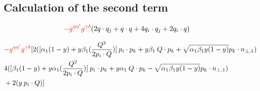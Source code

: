 
\subsection*{Calculation of the second term}

\begin{equation}
\begin{split}
&{\color[RGB]{255,0,0} -g^{{{\eta}}{{\eta}^{\prime}}}g^{{{\gamma}}{{\delta}}}}( 2q\cdot q_j+ q\cdot q+4q_i \cdot q_j+2q_i \cdot q)
\end{split}
\end{equation}

\begin{equation}
\begin{split}
&{\color[RGB]{255,0,0} -g^{{{\eta}}{{\eta}^{\prime}}}g^{{{\gamma}}{{\delta}}}}[ 2([\alpha_1 (1-y)+y\beta_1(\frac{Q^2}{2p_i \cdot Q})]\:p_i \cdot p_k+y\beta_1\:Q\cdot p_k+\sqrt{\alpha_1\beta_1y(1-y)} p_k \cdot {n_{\bot,1}})\\
&4([\beta_1 (1-y)+y\alpha_1(\frac{Q^2}{2p_i \cdot Q})]\:p_i \cdot p_k+y\alpha_1\:Q\cdot p_k-\sqrt{\alpha_1\beta_1y(1-y)} p_k \cdot {n_{\bot,1}})\\
&+2(y\:p_i\cdot Q)]
\end{split}
\end{equation}





